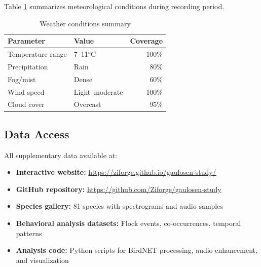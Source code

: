 \documentclass[twocolumn]{article}
\begin{document}
Table \ref{tab:weather} summarizes meteorological conditions during recording period.

\begin{table}[H]
\centering
\caption{Weather conditions summary}
\label{tab:weather}
\begin{tabular}{llr}
\toprule
\textbf{Parameter} & \textbf{Value} & \textbf{Coverage} \\
\midrule
Temperature range & 7--11°C & 100\% \\
Precipitation & Rain & 80\% \\
Fog/mist & Dense & 60\% \\
Wind speed & Light--moderate & 100\% \\
Cloud cover & Overcast & 95\% \\
\bottomrule
\end{tabular}
\end{table}

\subsection{Data Access}

All supplementary data available at:

\begin{itemize}
\item \textbf{Interactive website:} \url{https://ziforge.github.io/gaulosen-study/}
\item \textbf{GitHub repository:} \url{https://github.com/Ziforge/gaulosen-study}
\item \textbf{Species gallery:} 81 species with spectrograms and audio samples
\item \textbf{Behavioral analysis datasets:} Flock events, co-occurrences, temporal patterns
\item \textbf{Analysis code:} Python scripts for BirdNET processing, audio enhancement, and visualization
\end{itemize}
\end{document}
